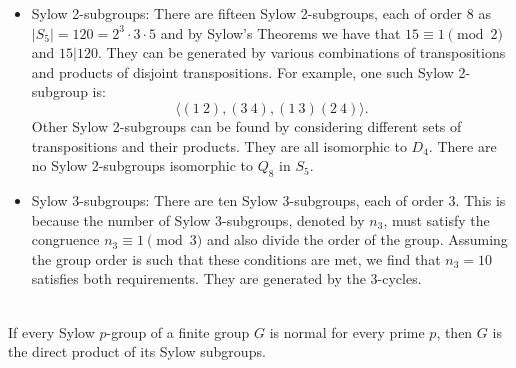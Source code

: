 \documentclass{article}
\begin{document}
\begin{enumerate}[(a)]
        \begin{itemize}
            \item Sylow 2-subgroups: There are fifteen Sylow 2-subgroups, each of order 8 as $|S_5| = 120 = 2^3 \cdot 3 \cdot 5$ and by Sylow's Theorems we have that $15 \equiv 1 \pmod{2}$ and $15| 120$. They can be generated by various combinations of transpositions and products of disjoint transpositions. For example, one such Sylow 2-subgroup is:
            \[
                \langle (1\ 2), (3\ 4), (1\ 3)(2\ 4) \rangle.
            \]
            Other Sylow 2-subgroups can be found by considering different sets of transpositions and their products. They are all isomorphic to $D_4$. There are no Sylow 2-subgroups isomorphic to $Q_8$ in $S_5$.
            \\
            \item Sylow 3-subgroups: There are ten Sylow 3-subgroups, each of order 3. This is because the number of Sylow 3-subgroups, denoted by $n_3$, must satisfy the congruence $n_3 \equiv 1 \pmod{3}$ and also divide the order of the group. Assuming the group order is such that these conditions are met, we find that $n_3 = 10$ satisfies both requirements. They are generated by the 3-cycles. 
        \end{itemize}
\end{enumerate}

\newpage
\begin{problem}[II.5.8] \\
    If every Sylow $p$-group of a finite group $G$ is normal for every prime $p$, then $G$ is the direct product of its Sylow subgroups.
\end{problem}
\end{document}

